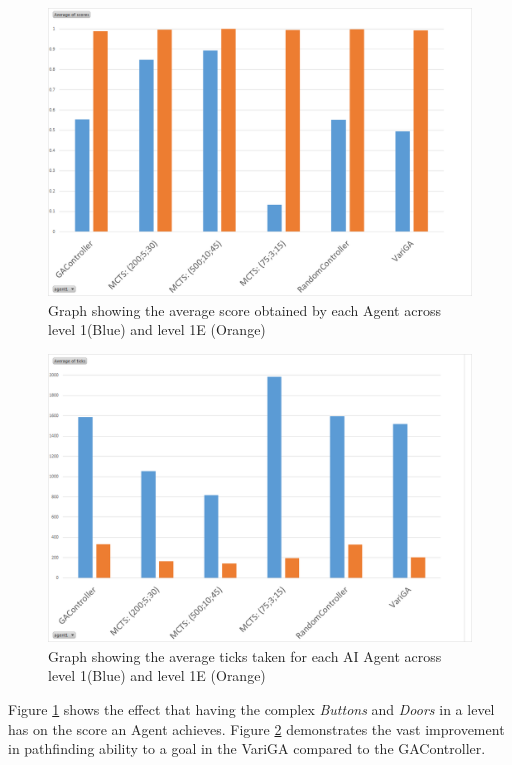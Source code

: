 \documentclass{IEEEtran}
\begin{document}
\begin{figure}[ht]
\centering
\includegraphics[width=\linewidth]{level1vsleve1e}
\caption{Graph showing the average score obtained by each Agent across level 1(Blue) and level 1E (Orange)}
\label{1v1eS}
\end{figure}

\begin{figure}[ht]
\centering
\includegraphics[width=\linewidth]{level1vsleve1eTicks}
\caption{Graph showing the average ticks taken for each AI Agent across level 1(Blue) and level 1E (Orange)}
\label{1v1eT}
\end{figure}

Figure \ref{1v1eS} shows the effect that having the complex \emph{Buttons} and \emph{Doors} in a level has on the score an Agent achieves. Figure \ref{1v1eT} demonstrates the vast improvement in pathfinding ability to a goal in the VariGA compared to the GAController.
\end{document}
